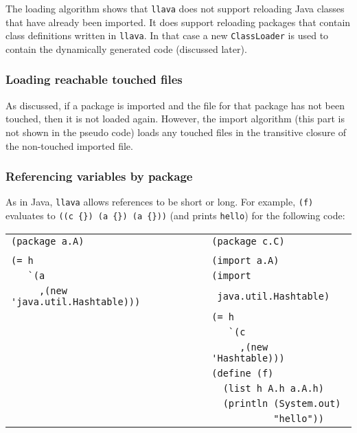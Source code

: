 \documentclass[final]{ieee}
\begin{document}
The loading algorithm shows that {\tt llava} does not support
reloading Java classes that have already been imported.  It does
support reloading packages that contain class definitions written in
{\tt llava}.  In that case a new {\tt ClassLoader} is used to contain
the dynamically generated code (discussed later).

\subsubsection{Loading reachable touched files}

As discussed, if a package is imported and the file for that package
has not been touched, then it is not loaded again.  However, the
import algorithm (this part is not shown in the pseudo code) loads any
touched files in the transitive closure of the non-touched imported
file.

\subsubsection{Referencing variables by package}

As in Java, {\tt llava} allows references to be short or long.  For
example, {\tt (f)} evaluates to \verb+((c {}) (a {}) (a {}))+ (and
prints {\tt hello}) for the following code:

\scriptsize
\begin{tabular}{l|l}
\verb+(package a.A)+                                   & \verb+(package c.C)+ \\
                                                       &                     \\
\verb+(= h+                                            & \verb+(import a.A)+ \\
\verb+   `(a+                                          & \verb+(import+ \\
\verb+     ,(new 'java.util.Hashtable)))+              & \verb+ java.util.Hashtable)+ \\
                                                       & \verb+(= h+ \\
                                                       & \verb+   `(c+ \\
                                                       & \verb+     ,(new 'Hashtable)))+ \\
                                                       & \verb+(define (f)+ \\
                                                       & \verb+  (list h A.h a.A.h)+ \\
                                                       & \verb+  (println (System.out)+ \\
                                                       & \verb+           "hello"))+ \\
\end{tabular}
\normalsize
\end{document}
